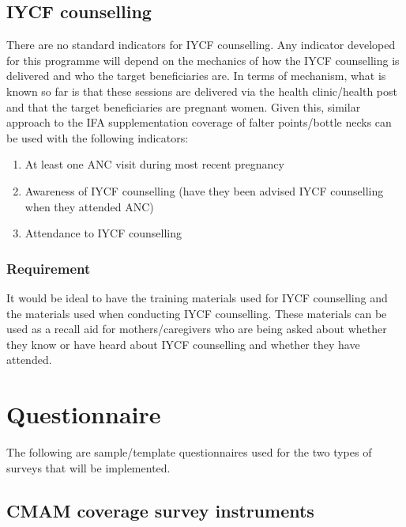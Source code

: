 \documentclass[12pt,a4paper]{book}
\theoremstyle{definition}
\theoremstyle{definition}
\theoremstyle{definition}
\theoremstyle{remark}
\begin{document}
\hypertarget{iycf-counselling}{%
\section{IYCF counselling}\label{iycf-counselling}}

There are no standard indicators for IYCF counselling. Any indicator
developed for this programme will depend on the mechanics of how the
IYCF counselling is delivered and who the target beneficiaries are. In
terms of mechanism, what is known so far is that these sessions are
delivered via the health clinic/health post and that the target
beneficiaries are pregnant women. Given this, similar approach to the
IFA supplementation coverage of falter points/bottle necks can be used
with the following indicators:

\begin{enumerate}
\def\labelenumi{\arabic{enumi}.}
\item
  At least one ANC visit during most recent pregnancy
\item
  Awareness of IYCF counselling (have they been advised IYCF counselling
  when they attended ANC)
\item
  Attendance to IYCF counselling
\end{enumerate}

\hypertarget{requirement-1}{%
\subsection{Requirement}\label{requirement-1}}

It would be ideal to have the training materials used for IYCF
counselling and the materials used when conducting IYCF counselling.
These materials can be used as a recall aid for mothers/caregivers who
are being asked about whether they know or have heard about IYCF
counselling and whether they have attended.

\hypertarget{questionnaire}{%
\chapter{Questionnaire}\label{questionnaire}}

The following are sample/template questionnaires used for the two types
of surveys that will be implemented.

\hypertarget{cmam-coverage-survey-instruments}{%
\section{CMAM coverage survey
instruments}\label{cmam-coverage-survey-instruments}}
\end{document}
